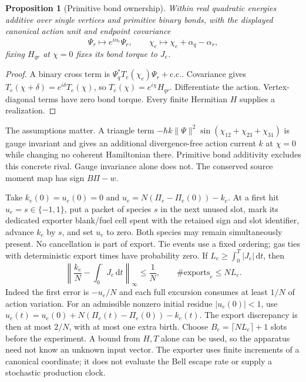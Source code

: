 \documentclass[11pt]{article}
\newtheorem{proposition}[theorem]{Proposition}
\theoremstyle{definition}\newtheorem{definition}[theorem]{Definition}
\theoremstyle{remark}\newtheorem{remark}[theorem]{Remark}
\newcommand{\dd}{\,\mathrm d}\newcommand{\Var}{\operatorname{Var}}
\begin{document}
\begin{proposition}[Primitive bond ownership]
Within real quadratic energies additive over single vertices and primitive binary bonds, with the displayed canonical action unit and endpoint covariance
\[
 \Psi_r\mapsto e^{i\alpha_r}\Psi_r,\qquad
 \chi_e\mapsto\chi_e+\alpha_q-\alpha_r,
\]
fixing $H_{qr}$ at $\chi=0$ fixes its bond torque to $J_e$.
\end{proposition}
\begin{proof}
A binary cross term is $\Psi_q^*T_e(\chi_e)\Psi_r+\mathrm{c.c.}$.
Covariance gives $T_e(\chi+\delta)=e^{i\delta}T_e(\chi)$, so $T_e(\chi)=e^{i\chi}H_{qr}$. Differentiate the action. Vertex-diagonal terms have zero bond torque. Every finite Hermitian $H$ supplies a realization.
\end{proof}
The assumptions matter. A triangle term $-\hbar k\|\Psi\|^2\sin(\chi_{12}+\chi_{23}+\chi_{31})$ is gauge invariant and gives an additional divergence-free action current $k$ at $\chi=0$ while changing no coherent Hamiltonian there. Primitive bond additivity excludes this concrete rival. Gauge invariance alone does not. The conserved source moment map has sign $B\Pi-w$.

Take $k_e(0)=u_e(0)=0$ and $u_e=N(\Pi_e-\Pi_e(0))-k_e$. At a first hit $u_e=s\in\{-1,1\}$, put a packet of species $s$ in the next unused slot, mark its dedicated exporter blank/fuel cell spent with the retained sign and slot identifier, advance $k_e$ by $s$, and set $u_e$ to zero. Both species may remain simultaneously present. No cancellation is part of export. Tie events use a fixed ordering; gas ties with deterministic export times have probability zero. If $L_e\ge\int_0^T|J_e|\dd t$, then
\begin{equation}
 \left\|\frac{k_e}{N}-\int_0^\cdot J_e\dd t\right\|_\infty\le\frac1N,
 \qquad \#\mathrm{exports}_e\le NL_e.
 \label{eq:export}
\end{equation}
Indeed the first error is $-u_e/N$ and each full excursion consumes at least $1/N$ of action variation. For an admissible nonzero initial residue $|u_e(0)|<1$, use $u_e(t)=u_e(0)+N(\Pi_e(t)-\Pi_e(0))-k_e(t)$. The export discrepancy is then at most $2/N$, with at most one extra birth. Choose $B_e=\lceil NL_e\rceil+1$ slots before the experiment. A bound from $H,T$ alone can be used, so the apparatus need not know an unknown input vector. The exporter uses finite increments of a canonical coordinate; it does not evaluate the Bell escape rate or supply a stochastic production clock.
\end{document}

